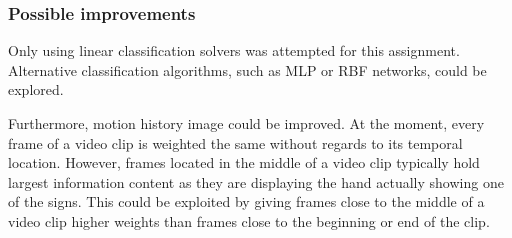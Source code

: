 \subsubsection*{Possible improvements}

Only using linear classification solvers was attempted for this assignment. Alternative classification algorithms, such as MLP or RBF networks, could be explored. 

Furthermore, motion history image could be improved. At the moment, every frame of a video clip is weighted the same without regards to its temporal location. However, frames located in the middle of a video clip typically hold largest information content as they are displaying the hand actually showing one of the signs. This could be exploited by giving frames close to the middle of a video clip higher weights than frames close to the beginning or end of the clip.

